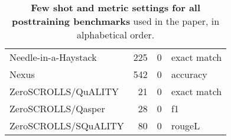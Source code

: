 \begin{table}
\begin{tabular}{lrrl}
        Needle-in-a-Haystack \citep{niah} & 225 & 0 & exact match  \\
        Nexus~\citep{srinivasan2023nexusraven} & 542 & 0 & accuracy \\
        ZeroSCROLLS/QuALITY \citep{zeroscrolls} & 21 & 0 & exact match  \\
        ZeroSCROLLS/Qasper \citep{zeroscrolls} & 28 & 0 & f1  \\
        ZeroSCROLLS/SQuALITY \citep{zeroscrolls} & 80 & 0 & rougeL  \\
        \bottomrule
    \end{tabular}
    \caption{\textbf{Few shot and metric settings for all posttraining benchmarks} used in the paper, in alphabetical order.
        \label{tab:posttraining_benchmark_metric_details}
    }
\end{table}
